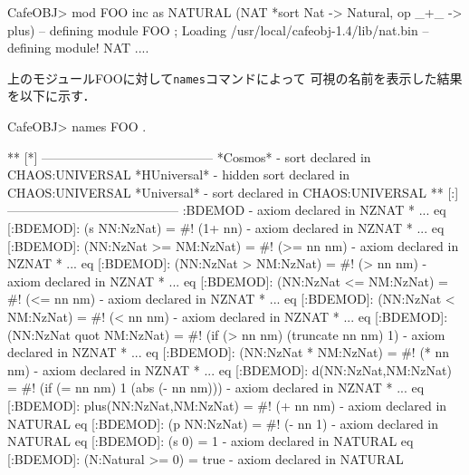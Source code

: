 \documentclass[a4paper,oneside,10pt]{memoir}
\newenvironment{vvtm}%
{\parskip=0pt\lineskip=0pt\begin{center}\begin{minipage}{0.8\textwidth}\begin{snugshade}}%
  {\end{snugshade}\end{minipage}\end{center}}
\begin{document}
\begin{vvtm}
\begin{examplev}
CafeOBJ> mod FOO { inc as NATURAL (NAT *{sort Nat -> Natural, op _+_ -> plus}) }
-- defining module FOO
; Loading /usr/local/cafeobj-1.4/lib/nat.bin
-- defining module! NAT
....
\end{examplev}
\end{vvtm}
上のモジュールFOOに対して\texttt{names}コマンドによって%
可視の名前を表示した結果を以下に示す．
\begin{vvtm}
\begin{examplev}
CafeOBJ> names FOO .

** [*] -----------------------------------------
*Cosmos*  
  - sort declared in CHAOS:UNIVERSAL
*HUniversal* 
  - hidden sort declared in CHAOS:UNIVERSAL
*Universal* 
  - sort declared in CHAOS:UNIVERSAL
** [:] -----------------------------------------
:BDEMOD   
  - axiom declared in NZNAT * { ... }
    eq [:BDEMOD]: (s NN:NzNat) = #! (1+ nn)
  - axiom declared in NZNAT * { ... }
    eq [:BDEMOD]: (NN:NzNat >= NM:NzNat)
     = #! (>= nn nm)
  - axiom declared in NZNAT * { ... }
    eq [:BDEMOD]: (NN:NzNat > NM:NzNat)
     = #! (> nn nm)
  - axiom declared in NZNAT * { ... }
    eq [:BDEMOD]: (NN:NzNat <= NM:NzNat)
     = #! (<= nn nm)
  - axiom declared in NZNAT * { ... }
    eq [:BDEMOD]: (NN:NzNat < NM:NzNat)
     = #! (< nn nm)
  - axiom declared in NZNAT * { ... }
    eq [:BDEMOD]: (NN:NzNat quot NM:NzNat)
     = #! (if (> nn nm) (truncate nn nm) 1)
  - axiom declared in NZNAT * { ... }
    eq [:BDEMOD]: (NN:NzNat * NM:NzNat)
     = #! (* nn nm)
  - axiom declared in NZNAT * { ... }
    eq [:BDEMOD]: d(NN:NzNat,NM:NzNat)
     = #! (if (= nn nm) 1 (abs (- nn nm)))
  - axiom declared in NZNAT * { ... }
    eq [:BDEMOD]: plus(NN:NzNat,NM:NzNat)
     = #! (+ nn nm)
  - axiom declared in NATURAL
    eq [:BDEMOD]: (p NN:NzNat) = #! (- nn 1)
  - axiom declared in NATURAL
    eq [:BDEMOD]: (s 0) = 1
  - axiom declared in NATURAL
    eq [:BDEMOD]: (N:Natural >= 0) = true
  - axiom declared in NATURAL
  \end{examplev}
  \end{vvtm}
\end{document}
